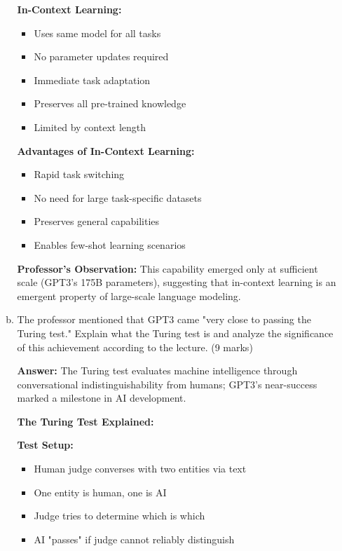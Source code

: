 \documentclass[12pt]{article}
\newcommand{\answer}[1]{{\color{answercolor}\textbf{Answer:} #1}}
\newcommand{\explanation}[1]{{\color{explanationcolor}#1}}
\begin{document}
\begin{enumerate}
\begin{enumerate}[(a)]
{    \textbf{In-Context Learning:}
    \begin{itemize}
        \item Uses same model for all tasks
        \item No parameter updates required
        \item Immediate task adaptation
        \item Preserves all pre-trained knowledge
        \item Limited by context length
    \end{itemize}
    
    \textbf{Advantages of In-Context Learning:}
    \begin{itemize}
        \item Rapid task switching
        \item No need for large task-specific datasets
        \item Preserves general capabilities
        \item Enables few-shot learning scenarios
    \end{itemize}
    
    \textbf{Professor's Observation:}
    This capability emerged only at sufficient scale (GPT3's 175B parameters), suggesting that in-context learning is an emergent property of large-scale language modeling.
    }
    
    \item The professor mentioned that GPT3 came "very close to passing the Turing test." Explain what the Turing test is and analyze the significance of this achievement according to the lecture. \hfill (9 marks)
    
    \answer{The Turing test evaluates machine intelligence through conversational indistinguishability from humans; GPT3's near-success marked a milestone in AI development.}
    
    \explanation{
    \textbf{The Turing Test Explained:}
    
    \textbf{Test Setup:}
    \begin{itemize}
        \item Human judge converses with two entities via text
        \item One entity is human, one is AI
        \item Judge tries to determine which is which
        \item AI "passes" if judge cannot reliably distinguish
    \end{itemize}
    
}
\end{enumerate}
\end{enumerate}
\end{document}

